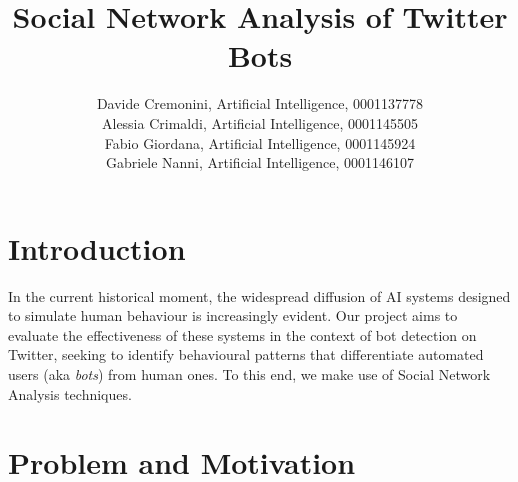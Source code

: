\documentclass[12pt, a4paper]{article}
\author{Davide Cremonini, Artificial Intelligence, 0001137778
\\Alessia Crimaldi, Artificial Intelligence, 0001145505
\\Fabio Giordana, Artificial Intelligence, 0001145924
\\Gabriele Nanni, Artificial Intelligence, 0001146107}
\date{}
\title{Social Network Analysis of Twitter Bots}
\begin{document}
\maketitle










\section{Introduction}
	\label{introduction}
	
	In the current historical moment, the widespread diffusion of AI systems designed to simulate human behaviour is increasingly evident. Our project aims to evaluate the effectiveness of these systems in the context of bot detection on Twitter, seeking to identify behavioural patterns that differentiate automated users (aka \textit{bots}) from human ones. To this end, we make use of Social Network Analysis techniques.


\section{Problem and Motivation}
	\label{problem-and-motivation}
	
\end{document}
